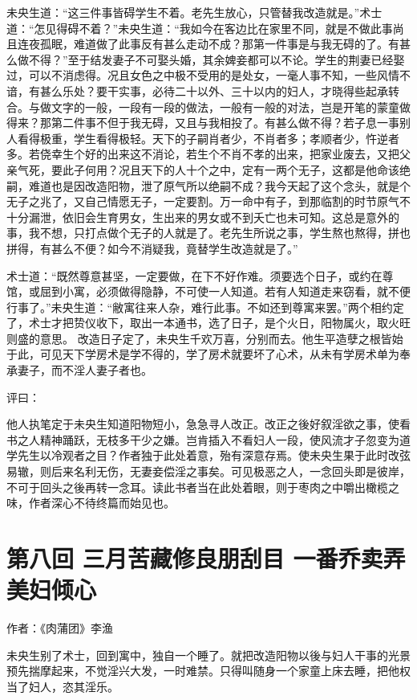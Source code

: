 \documentclass[a4paper,12pt,UTF8,twoside]{ctexbook}
\begin{document}
未央生道：“这三件事皆碍学生不着。老先生放心，只管替我改造就是。”术士道：“怎见得碍不着？”未央生道：“我如今在客边比在家里不同，就是不做此事尚且连夜孤眠，难道做了此事反有甚么走动不成？那第一件事是与我无碍的了。有甚么做不得？”至于结发妻子不可娶头婚，其余婢妾都可以不论。学生的荆妻已经娶过，可以不消虑得。况且女色之中极不受用的是处女，一毫人事不知，一些风情不谙，有甚么乐处？要干实事，必待二十以外、三十以内的妇人，才晓得些起承转合。与做文字的一般，一段有一段的做法，一般有一般的对法，岂是开笔的蒙童做得来？那第二件事不但于我无碍，又且与我相投了。有甚么做不得？若子息一事别人看得极重，学生看得极轻。天下的子嗣肖者少，不肖者多；孝顺者少，忤逆者多。若侥幸生个好的出来这不消论，若生个不肖不孝的出来，把家业废去，又把父亲气死，要此子何用？况且天下的人十个之中，定有一两个无子，这都是他命该绝嗣，难道也是因改造阳物，泄了原气所以绝嗣不成？我今天起了这个念头，就是个无子之兆了，又自己情愿无子，一定要割。万一命中有子，到那临割的时节原气不十分漏泄，依旧会生育男女，生出来的男女或不到夭亡也未可知。这总是意外的事，我不想，只打点做个无子的人就是了。老先生所说之事，学生熬也熬得，拼也拼得，有甚么不便？如今不消疑我，竟替学生改造就是了。”

术士道：“既然尊意甚坚，一定要做，在下不好作难。须要选个日子，或约在尊馆，或屈到小寓，必须做得隐静，不可使一人知道。若有人知道走来窃看，就不便行事了。”未央生道：“敝寓往来人杂，难行此事。不如还到尊寓来罢。”两个相约定了，术士才把贽仪收下，取出一本通书，选了日子，是个火日，阳物属火，取火旺则盛的意思。 改造日子定了，未央生千欢万喜，分别而去。他生平造孽之根皆始于此，可见天下学房术是学不得的，学了房术就要坏了心术，从未有学房术单为奉承妻子，而不淫人妻子者也。

评曰：

他人执笔定于未央生知道阳物短小，急急寻人改正。改正之後好叙淫欲之事，使看书之人精神踊跃，无枝多干少之嫌。岂肯插入不看妇人一段，使风流才子忽变为道学先生以冷观者之目？作者独于此处着意，殆有深意存焉。使未央生果于此时改弦易辙，则后来名利无伤，无妻妾偿淫之事矣。可见极恶之人，一念回头即是彼岸，不可于回头之後再转一念耳。读此书者当在此处着眼，则于枣肉之中嚼出橄榄之味，作者深心不待终篇而始见也。

\chapter{第八回 三月苦藏修良朋刮目 一番乔卖弄美妇倾心}

作者：《肉蒲团》李渔

未央生别了术士，回到寓中，独自一个睡了。就把改造阳物以後与妇人干事的光景预先揣摩起来，不觉淫兴大发，一时难禁。只得叫随身一个家童上床去睡，把他权当了妇人，恣其淫乐。
\end{document}
